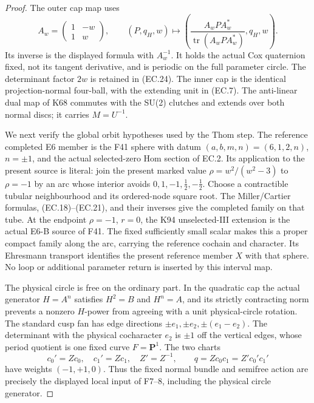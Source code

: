\begin{proof}
The outer cap map uses
\[
 A_w=\begin{pmatrix}1&-w\\1&w\end{pmatrix},\qquad
 (P,q_H,w)\mapsto
 \left(\frac{A_wPA_w^*}{\operatorname{tr}(A_wPA_w^*)},q_H,w\right).
 \tag{EC.25}
\]
Its inverse is the displayed formula with \(A_w^{-1}\). It holds
the actual Cox quaternion fixed, not its tangent derivative, and
is periodic on the full parameter circle. The determinant factor
\(2w\) is retained in (EC.24). The inner cap is the identical
projection-normal four-ball, with the extending unit in (EC.7).
The anti-linear dual map of K68 commutes with the SU(2) clutches
and extends over both normal discs; it carries \(M=U^{-1}\).

We next verify the global orbit hypotheses used by the Thom step.
The reference completed E6 member is the F41 sphere with datum
\((a,b,m,n)=(6,1,2,n)\), \(n=\pm1\), and the actual selected-zero
Hom section of EC.2. Its application to the present source is
literal: join the present marked value
\(\rho=w^2/(w^2-3)\) to \(\rho=-1\) by an arc whose interior
avoids \(0,1,-1,\tfrac12,-\tfrac12\). Choose a contractible
tubular neighbourhood and its ordered-node square root. The
Miller/Cartier formulas, (EC.18)--(EC.21), and their inverses give
the completed family on that tube. At the endpoint \(\rho=-1\),
\(r=0\), the K94 unselected-III extension is the actual E6-B
source of F41. The fixed sufficiently small scalar makes this a
proper compact family along the arc, carrying the reference
cochain and character. Its Ehresmann transport identifies the
present reference member \(X\) with that sphere. No loop or
additional parameter return is inserted by this interval map.

The physical circle is free on the ordinary part. In the quadratic
cap the actual generator \(H=A^n\) satisfies \(H^2=B\) and
\(H^n=A\), and its strictly contracting norm prevents a nonzero
\(H\)-power from agreeing with a unit physical-circle rotation.
The standard cusp fan has edge directions
\(\pm e_1,\pm e_2,\pm(e_1-e_2)\). The determinant with the
physical cocharacter \(e_2\) is \(\pm1\) off the vertical
edges, whose period quotient is one fixed curve \(F=\mathbf P^1\).
The two charts
\[
 c_0'=Zc_0,\quad c_1'=Zc_1,\quad Z'=Z^{-1},
 \qquad q=Zc_0c_1=Z'c_0'c_1'
 \tag{EC.25a}
\]
have weights \((-1,+1,0)\). Thus the fixed normal bundle and
semifree action are precisely the displayed local input of
F7--8, including the physical circle generator.


\end{proof}
